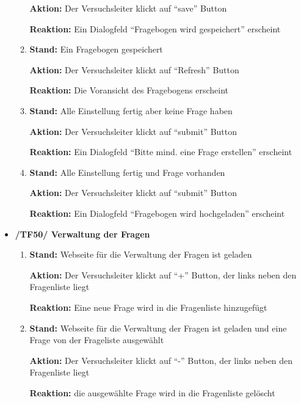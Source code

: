 \documentclass[a4paper]{scrreprt}
\begin{document}
\begin{itemize}
\begin{enumerate}
                              \par \textbf{Aktion: }Der \gls{Versuchsleiter} klickt auf ``save'' Button
                              \par \textbf{Reaktion: }Ein Dialogfeld ``Fragebogen wird gespeichert'' erscheint
                        \item \par \textbf{Stand: }Ein Fragebogen gespeichert
                              \par \textbf{Aktion: }Der \gls{Versuchsleiter} klickt auf ``Refresh'' Button
                              \par \textbf{Reaktion: }Die Voransicht des Fragebogens erscheint
                        \item \par \textbf{Stand: }Alle Einstellung fertig aber keine Frage haben
                              \par \textbf{Aktion: }Der \gls{Versuchsleiter} klickt auf ``submit'' Button
                              \par \textbf{Reaktion: }Ein Dialogfeld ``Bitte mind. eine Frage erstellen'' erscheint
                        \item \par \textbf{Stand: }Alle Einstellung fertig und Frage vorhanden
                              \par \textbf{Aktion: }Der \gls{Versuchsleiter} klickt auf ``submit'' Button
                              \par \textbf{Reaktion: }Ein Dialogfeld ``Fragebogen wird hochgeladen'' erscheint
                    \end{enumerate}

                \item \textbf{/TF50/ Verwaltung der Fragen}
                        \begin{enumerate}
                        \item \par \textbf{Stand: } Webseite für die Verwaltung der Fragen ist geladen
                              \par \textbf{Aktion: } Der \gls{Versuchsleiter} klickt auf ``+'' Button, der links neben den Fragenliste liegt
                              \par \textbf{Reaktion: } Eine neue Frage wird in die Fragenliste hinzugefügt
                              
                        \item \par \textbf{Stand: } Webseite für die Verwaltung der Fragen ist geladen und eine Frage von der Frageliste ausgewählt
                              \par \textbf{Aktion: }  Der \gls{Versuchsleiter} klickt auf ``-'' Button, der links neben den Fragenliste liegt 
                              \par \textbf{Reaktion: } die ausgewählte Frage wird in die Fragenliste gelöscht


\end{enumerate}
\end{itemize}
\end{document}
